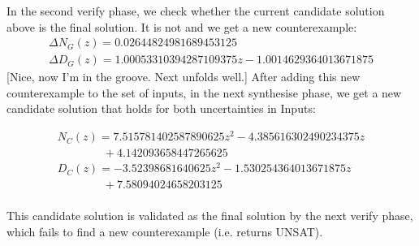\documentclass{sig-alternate-05-2015}
\newcommand{\blue}[1]{{\color{blue}#1}}
\begin{document}
In the second {\sc verify} phase, we check whether the current candidate
solution above is the final solution. It is not and we get a new counterexample:
$$
\begin{array}{ll}
\Delta N_G(z) = 0.02644824981689453125\\
\Delta D_G(z) {=} 1.00053310394287109375z{-}1.0014629364013671875
\end{array}
$$
\blue{[Nice, now I'm in the groove. Next unfolds well.] }
After adding this new counterexample to the set of {\sc inputs}, in the 
next {\sc synthesise} phase, we get a new candidate solution that holds
for both uncertainties in {\sc Inputs}:

$$
\begin{array}{ll}
N_C(z) {=} 7.515781402587890625z^2{-}4.385616302490234375z\\
\qquad\qquad +4.142093658447265625\\
D_C(z) {=} -3.52398681640625z^2{-}1.530254364013671875z \\
\qquad\qquad +7.58094024658203125\\
\end{array}
$$

This candidate solution is validated as the final solution by the next 
{\sc verify} phase, which fails to find a new counterexample (i.e. returns UNSAT).



\end{document}
